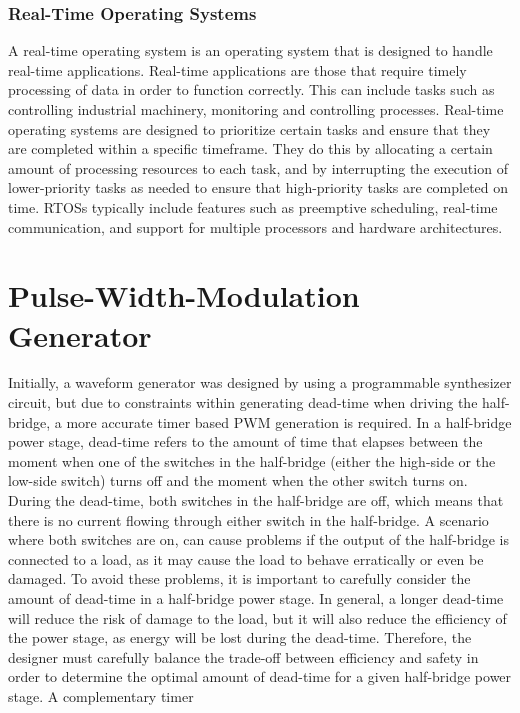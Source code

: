 \subsubsection{Real-Time Operating Systems}
A real-time operating system is an operating system that is designed to handle real-time applications. Real-time applications are those that require timely processing of data in order to function correctly. This can include tasks such as controlling industrial machinery, monitoring and controlling processes. Real-time operating systems are designed to prioritize certain tasks and ensure that they are completed within a specific timeframe. They do this by allocating a certain amount of processing resources to each task, and by interrupting the execution of lower-priority tasks as needed to ensure that high-priority tasks are completed on time. RTOSs typically include features such as preemptive scheduling, real-time communication, and support for multiple processors and hardware architectures.

\section{Pulse-Width-Modulation Generator}
Initially, a waveform generator was designed by using a programmable synthesizer circuit, but due to constraints within generating dead-time when driving the half-bridge, a more accurate timer based PWM generation is required. In a half-bridge power stage, dead-time refers to the amount of time that elapses between the moment when one of the switches in the half-bridge (either the high-side or the low-side switch) turns off and the moment when the other switch turns on. During the dead-time, both switches in the half-bridge are off, which means that there is no current flowing through either switch in the half-bridge. A scenario where both switches are on, can cause problems if the output of the half-bridge is connected to a load, as it may cause the load to behave erratically or even be damaged. To avoid these problems, it is important to carefully consider the amount of dead-time in a half-bridge power stage. In general, a longer dead-time will reduce the risk of damage to the load, but it will also reduce the efficiency of the power stage, as energy will be lost during the dead-time. Therefore, the designer must carefully balance the trade-off between efficiency and safety in order to determine the optimal amount of dead-time for a given half-bridge power stage.
A complementary timer

